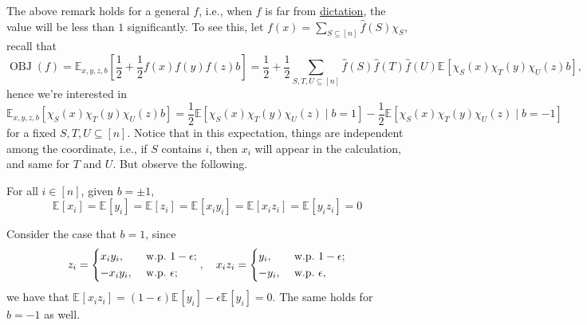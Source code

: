 The above remark holds for a general \(f\), i.e., when \(f\) is far from \hyperref[not:dictation]{dictation}, the value will be less than \(1\) significantly. To see this, let \(f(x) = \sum_{S \subseteq [n]} \hat{f} (S)\chi _S\), recall that
\[
	\mathop{\mathrm{OBJ}}(f)
	= \mathbb{E}_{x, y, z, b}\left[\frac{1}{2} + \frac{1}{2} f(x) f(y) f(z) b \right]
	= \frac{1}{2} + \frac{1}{2} \sum_{S, T, U \subseteq [n]} \hat{f} (S) \hat{f} (T) \hat{f} (U) \mathbb{E}_{}\left[\chi _S(x) \chi _T(y) \chi _U(z) b \right],
\]
hence we're interested in
\[
	\mathbb{E}_{x, y, z, b}\left[\chi _S(x) \chi _T(y) \chi _U (z) b \right]
	= \frac{1}{2} \mathbb{E}\left[\chi _S(x) \chi _T(y) \chi _U (z) \mid b=1\right] - \frac{1}{2} \mathbb{E}\left[\chi _S(x) \chi _T(y) \chi _U (z) \mid b=-1\right]
\]
for a fixed \(S, T, U \subseteq [n]\). Notice that in this expectation, things are independent among the coordinate, i.e., if \(S\) contains \(i\), then \(x_i\) will appear in the calculation, and same for \(T\) and \(U\). But observe the following.

\begin{claim}
	For all \(i\in [n]\), given \(b = \pm 1\),
	\[
		\mathbb{E}_{}\left[x_i \right]
		= \mathbb{E}_{}\left[y_i \right]
		= \mathbb{E}_{}\left[z_i \right]
		= \mathbb{E}_{}\left[x_i y_i \right]
		= \mathbb{E}_{}\left[x_i z_i \right]
		= \mathbb{E}_{}\left[y_i z_i \right]
		= 0
	\]
\end{claim}
\begin{explanation}
	Consider the case that \(b = 1\), since
	\[
		z_i = \begin{dcases}
			x_i y_i,  & \text{ w.p.\  } 1-\epsilon  ; \\
			-x_i y_i, & \text{ w.p.\  } \epsilon  ;
		\end{dcases},\quad x_i z_i = \begin{dcases}
			y_i,  & \text{ w.p.\  } 1-\epsilon  ; \\
			-y_i, & \text{ w.p.\  } \epsilon  ,
		\end{dcases}
	\]
	we have that \(\mathbb{E}_{}\left[x_i z_i \right] = (1 - \epsilon ) \mathbb{E}_{}\left[y_i \right] - \epsilon \mathbb{E}_{}\left[y_i \right] = 0\). The same holds for \(b = -1\) as well.
\end{explanation}

